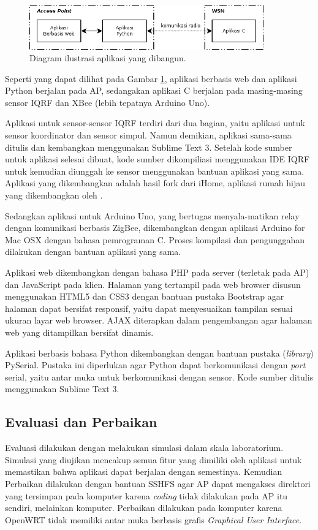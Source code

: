 			\begin{figure}[H]
			  \centering
			    \includegraphics[width=0.9\textwidth]{gambar/aplikasi}
			    \caption{Diagram ilustrasi aplikasi yang dibangun.}
			    \label{aplikasi}
			\end{figure}

		Seperti yang dapat dilihat pada Gambar \ref{aplikasi}, aplikasi berbasis web dan aplikasi Python berjalan pada AP, sedangakan aplikasi C berjalan pada masing-masing sensor IQRF dan XBee (lebih tepatnya Arduino Uno).

		Aplikasi untuk sensor-sensor IQRF terdiri dari dua bagian, yaitu aplikasi untuk sensor koordinator dan sensor simpul. Namun demikian, aplikasi sama-sama ditulis dan kembangkan menggunakan Sublime Text 3. Setelah kode sumber untuk aplikasi selesai dibuat, kode sumber dikompiliasi menggunakan IDE IQRF untuk kemudian diunggah ke sensor menggunakan bantuan aplikasi yang sama. Aplikasi yang dikembangkan adalah hasil fork dari iHome, aplikasi rumah hijau yang dikembangkan oleh \cite{widyawan2012ihome}.

		Sedangkan aplikasi untuk Arduino Uno, yang bertugas menyala-matikan relay dengan komunikasi berbasis ZigBee, dikembangkan dengan aplikasi Arduino for Mac OSX dengan bahasa pemrograman C. Proses kompilasi dan pengunggahan dilakukan dengan bantuan aplikasi yang sama.

		Aplikasi web dikembangkan dengan bahasa PHP pada server (terletak pada AP) dan JavaScript pada klien. Halaman yang tertampil pada web browser disusun menggunakan HTML5 dan CSS3 dengan bantuan pustaka Bootstrap agar halaman dapat bersifat responsif, yaitu dapat menyesuaikan tampilan sesuai ukuran layar web browser. AJAX diterapkan dalam pengembangan agar halaman web yang ditampilkan bersifat dinamis.

		Aplikasi berbasis bahasa Python dikembangkan dengan bantuan pustaka (\emph{library}) PySerial. Pustaka ini diperlukan agar Python dapat berkomunikasi dengan \emph{port} serial, yaitu antar muka untuk berkomunikasi dengan sensor. Kode sumber ditulis menggunakan Sublime Text 3.

	\subsection{Evaluasi dan Perbaikan}
		Evaluasi dilakukan dengan melakukan simulasi dalam skala laboratorium. Simulasi yang diujikan mencakup semua fitur yang dimiliki oleh aplikasi untuk memastikan bahwa aplikasi dapat berjalan dengan semestinya. Kemudian Perbaikan dilakukan dengan bantuan SSHFS agar AP dapat mengakses direktori yang tersimpan pada komputer karena \emph{coding} tidak dilakukan pada AP itu sendiri, melainkan komputer. Perbaikan dilakukan pada komputer karena OpenWRT tidak memiliki antar muka berbasis grafis \emph{Graphical User Interface}.

